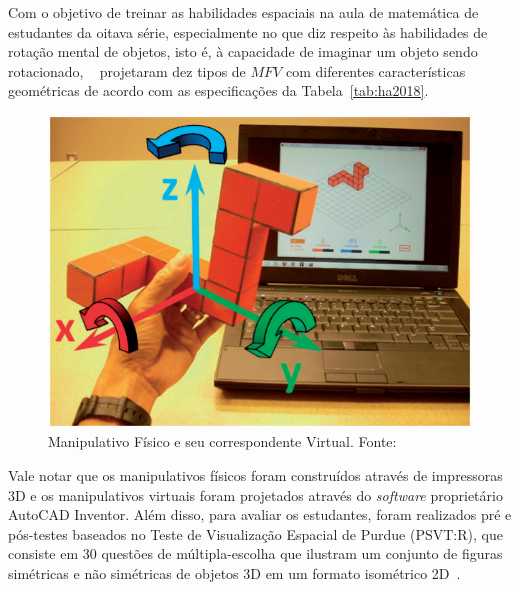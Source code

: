 Com o objetivo de treinar as habilidades espaciais na aula de matemática de estudantes da oitava série, especialmente no que diz respeito às habilidades de rotação mental de objetos, isto é, à capacidade de imaginar um objeto sendo rotacionado, ~\cite{ha:2018} projetaram dez tipos de $MFV$ com diferentes características geométricas de acordo com as especificações da Tabela~\ref{tab:ha2018}.

\begin{figure}[htb]
	\centering
	\includegraphics[width=0.7\linewidth]{chapters/works/ha2018_VPM.png}
	\caption{Manipulativo Físico e seu correspondente Virtual. Fonte:~\cite{ha:2018}}
	\label{fig:ha2018_VPM}
\end{figure}

Vale notar que os manipulativos físicos foram construídos através de impressoras 3D e os manipulativos virtuais foram projetados através do \textit{software} proprietário AutoCAD Inventor. Além disso, para avaliar os estudantes, foram realizados pré e pós-testes baseados no Teste de Visualização Espacial de Purdue (PSVT:R), que consiste em 30 questões de múltipla-escolha que ilustram um conjunto de figuras simétricas e não simétricas de objetos 3D em um formato isométrico 2D~\citep{ha:2018}.

